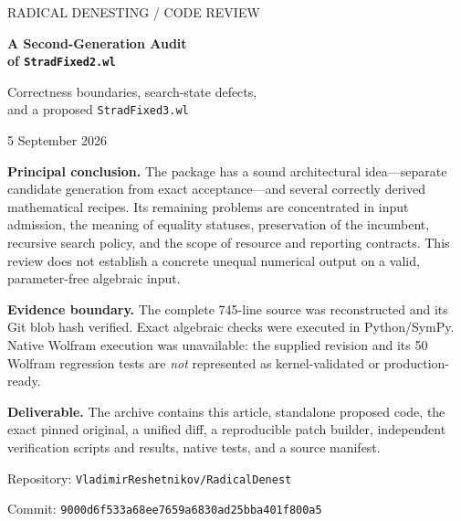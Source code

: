 \documentclass[11pt,a4paper]{article}
\theoremstyle{remark}\newtheorem{remark}[theorem]{Remark}
\begin{document}
\begin{titlepage}
\centering
\vspace*{18mm}
{\Large\sffamily\color{ink} RADICAL DENESTING / CODE REVIEW\par}
\vspace{12mm}
{\huge\bfseries A Second-Generation Audit\\[4pt] of \texttt{StradFixed2.wl}\par}
\vspace{8mm}
{\Large Correctness boundaries, search-state defects,\\[3pt] and a proposed \texttt{StradFixed3.wl}\par}
\vspace{12mm}
{\large 5 September 2026\par}
\vspace{16mm}
\begin{minipage}{.89\textwidth}
\textbf{Principal conclusion.} The package has a sound architectural idea---separate candidate generation from exact acceptance---and several correctly derived mathematical recipes. Its remaining problems are concentrated in input admission, the meaning of equality statuses, preservation of the incumbent, recursive search policy, and the scope of resource and reporting contracts. This review does not establish a concrete unequal numerical output on a valid, parameter-free algebraic input.

\medskip
\textbf{Evidence boundary.} The complete 745-line source was reconstructed and its Git blob hash verified. Exact algebraic checks were executed in Python/SymPy. Native Wolfram execution was unavailable: the supplied revision and its 50 Wolfram regression tests are \emph{not} represented as kernel-validated or production-ready.

\medskip
\textbf{Deliverable.} The archive contains this article, standalone proposed code, the exact pinned original, a unified diff, a reproducible patch builder, independent verification scripts and results, native tests, and a source manifest.
\end{minipage}
\vfill
{\small Repository: \texttt{VladimirReshetnikov/RadicalDenest}\par}
{\small Commit: \texttt{9000d6f533a68ee7659a6830ad25bba401f800a5}\par}
\end{titlepage}
\end{document}
